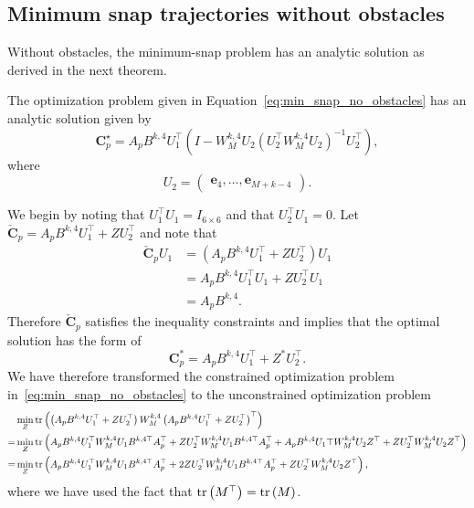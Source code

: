 \subsection{Minimum snap trajectories without obstacles}

Without obstacles, the minimum-snap problem has an analytic solution as derived in the next theorem.
\begin{theorem}
	The optimization problem given in Equation~\eqref{eq:min_snap_no_obstacles} has an analytic solution given by
	\begin{equation}
		\mathbf{C}_p^\star  = A_p B^{k,4} U_1^\top \left(I-W_M^{k,4}U_2(U_2^\top W_M^{k,4} U_2)^{-1}U_2^\top\right),
	\end{equation}
	where
	\[
	U_2 = \begin{pmatrix} \mathbf{e}_4, \dots, \mathbf{e}_{M+k-4} \end{pmatrix}.
	\]
\end{theorem}
\proof
	We begin by noting that $U_1^\top U_1=I_{6\times 6}$ and that $U_2^\top U_1 = 0$.  Let $\check{\mathbf{C}}_p= A_pB^{k,4} U_1^\top + Z U_2^\top$ and note that
	\begin{align*}
		\check{\mathbf{C}}_pU_1 
			&= \left(	A_p B^{k,4} U_1^\top + Z U_2^\top \right) U_1 \\
			&= A_p B^{k,4} U_1^\top U_1 + Z U_2^\top U_1  \\
			&= A_p B^{k,4}.
	\end{align*}
	Therefore $\check{\mathbf{C}}_p$ satisfies the inequality constraints and implies that the optimal solution has the form of 
	\[
		\mathbf{C}_p^\ast = A_p B^{k,4} U_1^\top + Z^\ast U_2^\top.
	\]
	We have therefore transformed the constrained optimization problem in~\ref{eq:min_snap_no_obstacles} to the unconstrained optimization problem
	\begin{align*}
	&\min_{Z} \text{tr}\left(\left(A_pB^{k,4} U_1^\top + Z U_2^\top\right) W_M^{k,4} \left(A_pB^{k,4} U_1^\top + Z U_2^\top\right)^\top\right) \\
	= &\min_{Z} \text{tr}\left(A_pB^{k,4} U_1^\top W_M^{k,4} U_1 B^{k,4\top} A_p^\top + Z U_2^\top W_M^{k,4} U_1 B^{k,4\top}A_p^\top +  A_p B^{k,4} U_1\top W_M^{k,4} U_2 Z^\top + Z U_2^\top W_M^{k,4} U_2 Z^\top\right) \\
	= &\min_{Z} \text{tr}\left(A_p B^{k,4} U_1^\top W_M^{k,4} U_1 B^{k,4\top}A_p^\top + 2Z U_2^\top W_M^{k,4} U_1 B^{k,4\top}A_p^\top + Z U_2^\top W_M^{k,4} U_2 Z^\top\right),
	\end{align*}
	where we have used the fact that $\text{tr}\left(M^\top\right)=\text{tr}\left(M\right)$.
